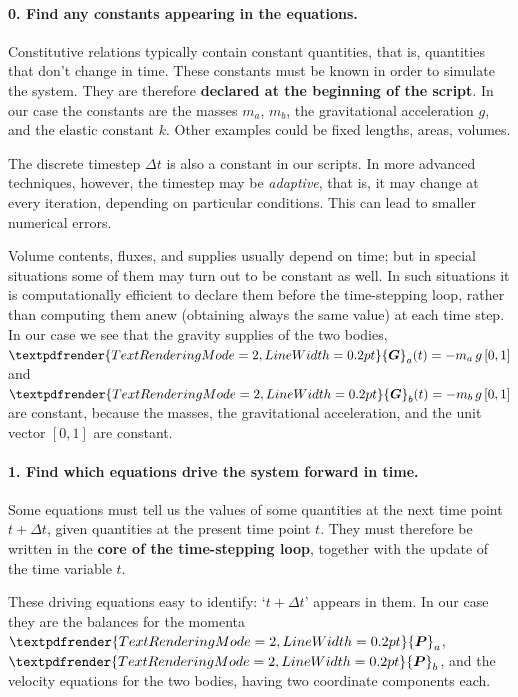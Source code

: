 \documentclass[a4paper,12pt,%
onecolumn,oneside,%
british%
]{memoir}
\renewcommand*{\bm}[1]{\textpdfrender{TextRenderingMode=2,LineWidth=0.2pt}{\boldsymbol{#1}}}
\newcommand*{\incr}{\Delta}%
\renewcommand*{\|}[1][]{\nonscript\:#1\vert\nonscript\:\mathopen{}}
\newcommand*{\Dt}{\incr t}
\newcommand*{\ym}{m}%
\newcommand*{\yma}{\ym_{a}}
\newcommand*{\ymb}{\ym_{b}}
\newcommand*{\yP}{\bm{P}}
\newcommand*{\yPa}{\yP_{a}}
\newcommand*{\yPb}{\yP_{b}}
\newcommand*{\yG}{\bm{G}}
\newcommand*{\yGa}{\yG_{a}}
\newcommand*{\yGb}{\yG_{b}}
\begin{document}
\paragraph{\color{red}0. Find any constants appearing in the equations.}

Constitutive relations typically contain constant quantities, that is, quantities that don't change in time. These constants must be known in order to simulate the system. They are therefore \textbf{declared at the beginning of the script}. In our case the constants are the masses $\yma$, $\ymb$, the gravitational acceleration $g$, and the elastic constant $k$. Other examples could be fixed lengths, areas, volumes.

The discrete timestep $\Dt$ is also a constant in our scripts. In more advanced techniques, however, the timestep may be \emph{adaptive}, that is, it may change at every iteration, depending on particular conditions. This can lead to smaller numerical errors.

Volume contents, fluxes, and supplies usually depend on time; but in special situations some of them may turn out to be constant as well. In such situations it is computationally efficient to declare them before the time-stepping loop, rather than computing them anew (obtaining always the same value) at each time step. In our case we see that the gravity supplies of the two bodies, $\yGa(t) = -\yma\,g\,[0,1]$ and $\yGb(t) = -\ymb\,g\,[0,1]$ are constant, because the masses, the gravitational acceleration, and the unit vector $[0,1]$ are constant.


\paragraph{\color{green}1. Find which equations drive the system forward in time.}

Some equations must tell us the values of some quantities at the next time point $t+\Dt$, given quantities at the present time point $t$. They must therefore be written in the \textbf{core of the time-stepping loop}, together with the update of the time variable $t$.

These driving equations easy to identify: \enquote*{$t+\Dt$} appears in them. In our case they are the balances for the momenta $\yPa$, $\yPb$, and the velocity equations for the two bodies, having two coordinate components each.
\end{document}

